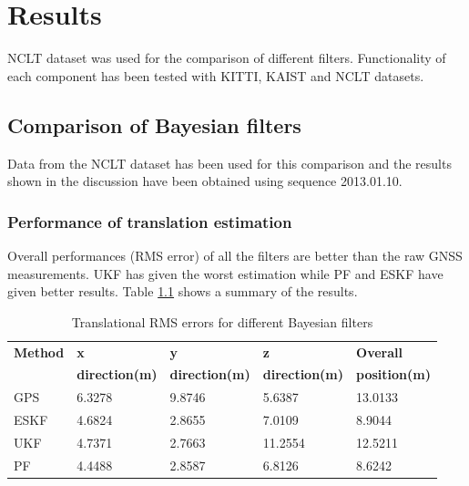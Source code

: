 \chapter{Results}
\label{chapter:results}
\gls{NCLT} dataset was used for the comparison of different filters. Functionality of each component has been tested with \gls{KITTI}, \gls{KAIST} and \gls{NCLT} datasets.



\section{Comparison of Bayesian filters}
\label{sec:BayesianFilterComparison}
Data from the \gls{NCLT} dataset has been used for this comparison and the results shown in the discussion have been obtained using sequence 2013.01.10.
\subsection{Performance of translation estimation}
Overall performances (\gls{RMS} error) of all the filters are better than the raw \gls{GNSS} measurements. \gls{UKF} has given the worst estimation while \gls{PF} and \gls{ESKF} have given better results. Table \ref{table:ch:RMSErrorPosition} shows a summary of the results.
\begin{table}[h]
    \centering
    \begin{tabular}{|p{2.5cm}|p{2.5cm}|p{2.5cm}|p{2.5cm}|p{2.5cm}|} 
        \hline
        \textbf{Method} & \textbf{x} & \textbf{y} & \textbf{z}& \textbf{Overall} \\
        \textbf{} & \textbf{direction(m)} & \textbf{direction(m)} & \textbf{direction(m)}& \textbf{position(m)} \\
        \hline
        GPS&6.3278 &9.8746 &5.6387& 13.0133\\
        \hline
        ESKF &4.6824& 2.8655 &7.0109 &8.9044\\
        \hline
        UKF &4.7371& 2.7663 &11.2554 &12.5211
        \\
        \hline
        PF& 4.4488& 2.8587& 6.8126& 8.6242
        \\
        \hline
    \end{tabular}
\caption{Translational \gls{RMS} errors for different Bayesian filters}
\label{table:ch:RMSErrorPosition}
\end{table}

